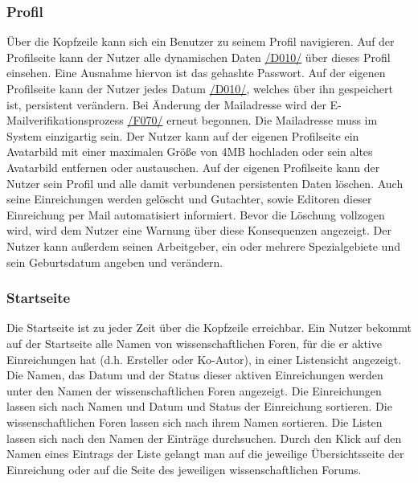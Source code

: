 \subsubsection{Profil}
\begin{description}
     Über die Kopfzeile kann sich ein Benutzer zu seinem Profil navigieren.
     Auf der Profilseite kann der Nutzer alle dynamischen Daten \hyperref[d010]{/D010/} über dieses Profil einsehen.
    Eine Ausnahme hiervon ist das gehashte Passwort.
     Auf der eigenen Profilseite kann der Nutzer jedes Datum \hyperref[d010]{/D010/},
    welches über ihn gespeichert ist, persistent verändern.
     Bei Änderung der Mailadresse wird der E-Mailverifikationsprozess \hyperref[funkt:070]{/F070/} erneut
    begonnen. Die Mailadresse muss im System einzigartig sein.
     Der Nutzer kann auf der eigenen Profilseite ein Avatarbild mit einer maximalen
    Größe von 4MB hochladen oder sein altes Avatarbild entfernen oder austauschen. %
     Auf der eigenen Profilseite kann der Nutzer sein Profil und alle damit verbundenen persistenten
    Daten löschen. Auch seine Einreichungen werden gelöscht und Gutachter, sowie Editoren dieser
    Einreichung per Mail automatisiert informiert. Bevor die Löschung vollzogen wird, wird dem Nutzer
    eine Warnung über diese Konsequenzen angezeigt.
     Der Nutzer kann außerdem seinen Arbeitgeber, ein oder mehrere Spezialgebiete
    und sein Geburtsdatum angeben und verändern.
\end{description}

\subsubsection{Startseite}
\begin{description}
     Die Startseite ist zu jeder Zeit über die Kopfzeile erreichbar.
     Ein Nutzer bekommt auf der Startseite alle Namen von wissenschaftlichen Foren,
    für die er aktive Einreichungen hat (d.h. Ersteller oder Ko-Autor), in einer Listensicht angezeigt.
    Die Namen, das Datum und der Status dieser aktiven Einreichungen werden unter den Namen der wissenschaftlichen
    Foren angezeigt.
     Die Einreichungen lassen sich nach Namen und Datum und Status
    der Einreichung sortieren. Die wissenschaftlichen Foren lassen sich nach ihrem Namen sortieren.
     Die Listen lassen sich nach den Namen der Einträge durchsuchen.
     Durch den Klick auf den Namen eines Eintrags der Liste gelangt man auf die jeweilige Übersichtsseite
    der Einreichung oder auf die Seite des jeweiligen wissenschaftlichen Forums.
\end{description}

